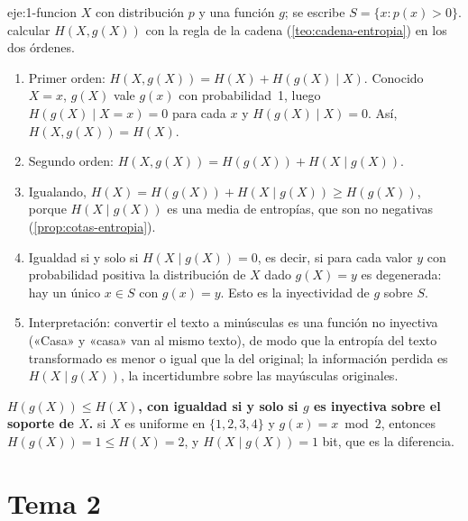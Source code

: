 \begin{solucion}{eje:1-funcion}
\datos $X$ con distribución $p$ y una función $g$; se escribe $S=\{x:p(x)>0\}$.
\planteamiento calcular $H(X,g(X))$ con la regla de la cadena (\cref{teo:cadena-entropia}) en los dos órdenes.
\pasos
\begin{enumerate}[label=\arabic*.]
  \item Primer orden: $H(X,g(X))=H(X)+H(g(X)\mid X)$. Conocido $X=x$, $g(X)$ vale $g(x)$ con probabilidad~1, luego $H(g(X)\mid X=x)=0$ para cada $x$ y $H(g(X)\mid X)=0$. Así, $H(X,g(X))=H(X)$.
  \item Segundo orden: $H(X,g(X))=H(g(X))+H(X\mid g(X))$.
  \item Igualando, $H(X)=H(g(X))+H(X\mid g(X))\ge H(g(X))$, porque $H(X\mid g(X))$ es una media de entropías, que son no negativas (\cref{prop:cotas-entropia}).
  \item Igualdad si y solo si $H(X\mid g(X))=0$, es decir, si para cada valor $y$ con probabilidad positiva la distribución de $X$ dado $g(X)=y$ es degenerada: hay un único $x\in S$ con $g(x)=y$. Esto es la inyectividad de $g$ sobre $S$.
  \item Interpretación: convertir el texto a minúsculas es una función no inyectiva («Casa» y «casa» van al mismo texto), de modo que la entropía del texto transformado es menor o igual que la del original; la información perdida es $H(X\mid g(X))$, la incertidumbre sobre las mayúsculas originales.
\end{enumerate}
\resultado \textbf{$H(g(X))\le H(X)$, con igualdad si y solo si $g$ es inyectiva sobre el soporte de $X$.}
\comprobacion si $X$ es uniforme en $\{1,2,3,4\}$ y $g(x)=x\bmod 2$, entonces $H(g(X))=1\le H(X)=2$, y $H(X\mid g(X))=1$ bit, que es la diferencia.
\end{solucion}

\section{Tema 2}

